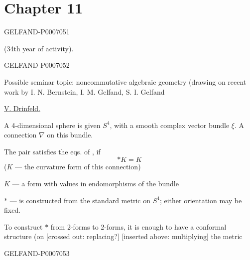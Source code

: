 \clearpage\section*{Chapter 11}

\begin{GelfandAdjacentEvidence}{GELFAND-P000705}{1}

\quad {} \quad (34th year of activity).
\end{GelfandAdjacentEvidence}
\begin{GelfandAdjacentEvidence}{GELFAND-P000705}{2}


Possible seminar topic: noncommutative algebraic geometry
(drawing on recent work by I. N. Bernstein, I. M. Gelfand, S. I. Gelfand

\underline{V. Drinfeld.}\quad{}

A 4-dimensional sphere is given \(S^4\), with a smooth complex vector bundle \(\xi\).
A connection \(\nabla\) on this bundle.

The pair satisfies the eqs. of , if
\begin{equation}
*K=K \tag{1}
\end{equation}
(\(K\) --- the curvature form of this connection)

\(K\) --- a form with values in endomorphisms of the bundle

\(*\) --- is constructed from the standard metric on \(S^4\);
either orientation may be fixed.

To construct \(*\) from 2-forms to 2-forms, it is enough to have a conformal structure (on
[crossed out: replacing?] [inserted above: multiplying] the metric
\end{GelfandAdjacentEvidence}
\begin{GelfandAdjacentEvidence}{GELFAND-P000705}{3}

\end{GelfandAdjacentEvidence}



